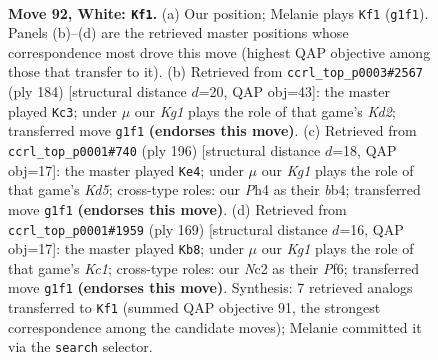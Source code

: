 \documentclass[11pt]{article}
\begin{document}
\clearpage

\begin{figure}[p]\centering
\begin{subfigure}{0.46\textwidth}\centering
\resizebox{\linewidth}{!}{%
\newchessgame
\chessboard[
  setfen={8/6p1/4kp2/7p/7P/6P1/1RNr4/6K1 w - - 8 92},
  showmover=false,
  pgfstyle=straightmove, color=movearrow, markmove={g1-f1}
]}
\caption{}
\end{subfigure}\hfill
\begin{subfigure}{0.46\textwidth}\centering
\resizebox{\linewidth}{!}{%
\newchessgame
\chessboard[
  setfen={8/8/1p6/1p4k1/3r3p/P2N1R2/3K4/8 w - - 46 93},
  showmover=false,
  pgfstyle=straightmove, color=movearrow, markmove={d2-c3}
]}
\caption{}
\end{subfigure}
\\[4pt]
\begin{subfigure}{0.46\textwidth}\centering
\resizebox{\linewidth}{!}{%
\newchessgame
\chessboard[
  setfen={6k1/5p2/5P2/p2K2P1/Pb1N3R/8/8/3r4 w - - 18 99},
  showmover=false,
  pgfstyle=straightmove, color=movearrow, markmove={d5-e4}
]}
\caption{}
\end{subfigure}\hfill
\begin{subfigure}{0.46\textwidth}\centering
\resizebox{\linewidth}{!}{%
\newchessgame
\chessboard[
  setfen={2k5/5R2/P2p1p2/2p5/2P5/1P6/5r2/1K6 b - - 0 85},
  showmover=false,
  pgfstyle=straightmove, color=movearrow, markmove={c8-b8}
]}
\caption{}
\end{subfigure}
\caption{\textbf{Move 92, White: \texttt{Kf1}.} (a) Our position; Melanie plays \texttt{Kf1} (\texttt{g1f1}). Panels (b)--(d) are the retrieved master positions whose correspondence most drove this move (highest QAP objective among those that transfer to it). (b) Retrieved from \texttt{ccrl\_top\_p0003\#2567} (ply 184) [structural distance $d$=20, QAP obj=43]: the master played \texttt{Kc3}; under $\mu$ our \emph{Kg1} plays the role of that game's \emph{Kd2}; transferred move \texttt{g1f1} \textbf{(endorses this move)}. (c) Retrieved from \texttt{ccrl\_top\_p0001\#740} (ply 196) [structural distance $d$=18, QAP obj=17]: the master played \texttt{Ke4}; under $\mu$ our \emph{Kg1} plays the role of that game's \emph{Kd5}; cross-type roles: our \emph{P}h4 as their \emph{b}b4; transferred move \texttt{g1f1} \textbf{(endorses this move)}. (d) Retrieved from \texttt{ccrl\_top\_p0001\#1959} (ply 169) [structural distance $d$=16, QAP obj=17]: the master played \texttt{Kb8}; under $\mu$ our \emph{Kg1} plays the role of that game's \emph{Kc1}; cross-type roles: our \emph{N}c2 as their \emph{P}f6; transferred move \texttt{g1f1} \textbf{(endorses this move)}. Synthesis: 7 retrieved analogs transferred to \texttt{Kf1} (summed QAP objective 91, the strongest correspondence among the candidate moves); Melanie committed it via the \texttt{search} selector.}
\label{fig:thought-m182}
\end{figure}
\end{document}
